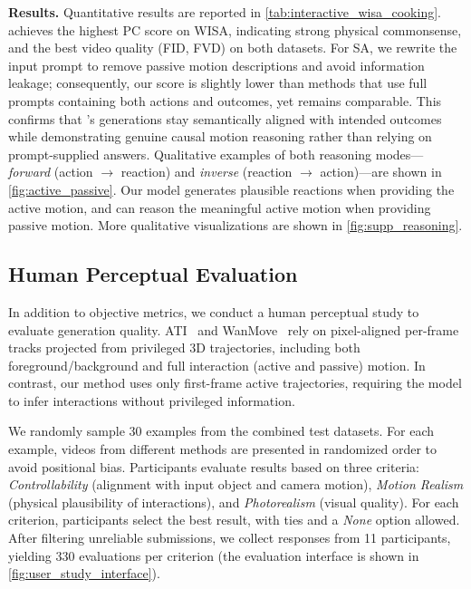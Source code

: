 \noindent\textbf{Results.}
Quantitative results are reported in \cref{tab:interactive_wisa_cooking}.
\ours achieves the highest PC score on WISA, indicating strong physical commonsense, and the best video quality (FID, FVD) on both datasets.
For SA, we rewrite the input prompt to remove passive motion descriptions and avoid information leakage; consequently, our score is slightly lower than methods that use full prompts containing both actions and outcomes, yet remains comparable.
This confirms that \ours's generations stay semantically aligned with intended outcomes while demonstrating genuine causal motion reasoning rather than relying on prompt-supplied answers.
Qualitative examples of both reasoning modes---\emph{forward} (action $\rightarrow$ reaction) and \emph{inverse} (reaction $\rightarrow$ action)---are shown in \cref{fig:active_passive}. Our model generates plausible reactions when providing the active motion, and can reason the meaningful active motion when providing passive motion. More qualitative visualizations are shown in \cref{fig:supp_reasoning}.


\subsection{Human Perceptual Evaluation}
\label{sec:human_eval}

In addition to objective metrics, we conduct a human perceptual study to evaluate generation quality. ATI~\cite{wang2025ati} and WanMove~\cite{chu2025wanmove} rely on pixel-aligned per-frame tracks projected from privileged 3D trajectories, including both foreground/background and full interaction (active and passive) motion. In contrast, our method uses only first-frame active trajectories, requiring the model to infer interactions without privileged information.

We randomly sample 30 examples from the combined test datasets. For each example, videos from different methods are presented in randomized order to avoid positional bias. Participants evaluate results based on three criteria: \emph{Controllability} (alignment with input object and camera motion), \emph{Motion Realism} (physical plausibility of interactions), and \emph{Photorealism} (visual quality). For each criterion, participants select the best result, with ties and a \textit{None} option allowed. After filtering unreliable submissions, we collect responses from 11 participants, yielding 330 evaluations per criterion (the evaluation interface is shown in \cref{fig:user_study_interface}).

